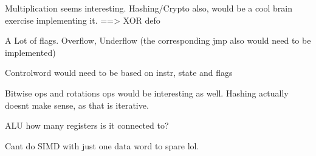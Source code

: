 Multiplication seems interesting. 
Hashing/Crypto also, would be a cool brain exercise implementing it. ==> XOR defo

 A Lot of flags. Overflow, Underflow (the corresponding jmp also would need to be implemented)

 Controlword would need to be based on instr, state and flags

Bitwise ops and rotations ops would be interesting as well. 
Hashing actually doesnt make sense, as that is iterative. 

ALU how many registers is it connected to?

Cant do SIMD with just one data word to spare lol. 






